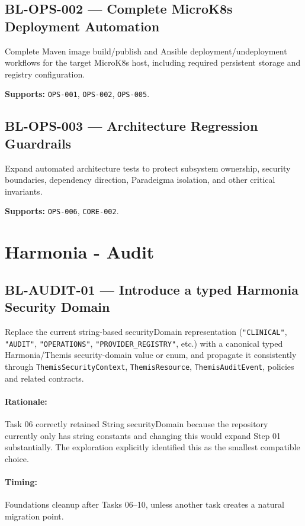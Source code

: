 \subsection{BL-OPS-002 --- Complete MicroK8s Deployment Automation}
Complete Maven image build/publish and Ansible deployment/undeployment workflows for the target MicroK8s host, including required persistent storage and registry configuration.

\textbf{Supports:} \texttt{OPS-001}, \texttt{OPS-002}, \texttt{OPS-005}.

\subsection{BL-OPS-003 --- Architecture Regression Guardrails}
Expand automated architecture tests to protect subsystem ownership, security boundaries, dependency direction, Paradeigma isolation, and other critical invariants.

\textbf{Supports:} \texttt{OPS-006}, \texttt{CORE-002}.

\section{Harmonia - Audit}
\subsection{BL-AUDIT-01 --- Introduce a typed Harmonia Security Domain}

Replace the current string-based securityDomain representation (\texttt{"CLINICAL"}, \texttt{"AUDIT"}, \texttt{"OPERATIONS"}, \texttt{"PROVIDER\_REGISTRY"}, etc.) with a canonical typed Harmonia/Themis security-domain value or enum, and propagate it consistently through \texttt{ThemisSecurityContext}, \texttt{ThemisResource}, \texttt{ThemisAuditEvent}, policies and related contracts.

\paragraph{Rationale:} Task 06 correctly retained String securityDomain because the repository currently only has string constants and changing this would expand Step 01 substantially. The exploration explicitly identified this as the smallest compatible choice.

\paragraph{Timing:} Foundations cleanup after Tasks 06--10, unless another task creates a natural migration point.

